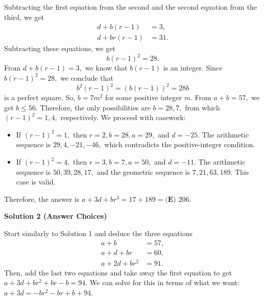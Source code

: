 \begin{enumerate}
 Subtracting the first equation from the second and the second equation from the third, we get
 \begin{align*} d+b(r-1)&=3, \\ d+br(r-1)&=31. \end{align*}
Subtracting these equations, we get 
 \[b(r-1)^2=28.\]From $d+b(r-1)=3,$ we know that $b(r-1)$ is an integer. Since $b(r-1)^2=28,$ we conclude that 
 \[b^2(r-1)^2=(b(r-1))^2=28b\] is a perfect square. So, $b=7m^2$ for some positive integer $m.$ From $a+b=57,$ we get $b\leq56.$ Therefore, the only possibilities are $b=28,7,$ from which $(r-1)^2=1,4,$ respectively. We proceed with casework:

 
            \begin{itemize}
        \item If $(r-1)^2=1,$ then $r=2,b=28,a=29,$ and $d=-25.$ The arithmetic sequence is $29,4,-21,-46,$ which contradicts the positive-integer condition.
            \end{itemize}
            
            \begin{itemize}
        \item If $(r-1)^2=4,$ then $r=3,b=7,a=50,$ and $d=-11.$ The arithmetic sequence is $50,39,28,17,$ and the geometric sequence is $7,21,63,189.$ This case is valid.
            \end{itemize}
            Therefore, the answer is $a+3d+br^3=17+189=\boxed{\textbf{(E) } 206}.$




\textbf{Solution 2 (Answer Choices)}

Start similarly to Solution 1 and deduce the three equations
 \begin{align*} a+b&=57, \\ a+d+br&=60, \\ a+2d+br^2&=91. \end{align*}
Then, add the last two equations and take away the first equation to get $a+3d+br^2+br-b=94$. We can solve for this in terms of what we want: $a+3d=-br^2-br+b+94$.


\end{enumerate}
